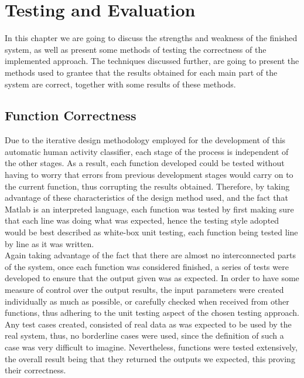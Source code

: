 \documentclass[11pt]{report}
\begin{document}
\clearpage

\chapter{Testing and Evaluation}
In this chapter we are going to discuss the strengths and weakness  of the finished system, as well as present some methods of testing the correctness of the implemented approach. The techniques discussed further, are going to present the methods used to grantee that the results obtained for each main part of the system are correct, together with some results of these methods.\\

\section{Function Correctness}
Due to the iterative design methodology employed for the development of this automatic human activity classifier, each stage of the process is independent of the other stages. As a result, each function developed could be tested without having to worry that errors from previous development stages would carry on to the current function, thus corrupting the results obtained. Therefore, by taking advantage of these characteristics of the design method used, and the fact that Matlab is an interpreted language, each function was tested by first making sure that each line was doing what was expected, hence the testing style adopted would be best described as white-box unit testing, each function being tested line by line as it was written. \\
Again taking advantage of the fact that there are almost no interconnected parts of the system, once each function was considered finished, a series of tests were developed to ensure that the output given was as expected. In order to have some measure of control over the output results, the input parameters were created individually as much as possible, or carefully checked when received from other functions, thus adhering to the unit testing aspect of the chosen testing approach. \\
Any test cases created, consisted of real data as was expected to be used by the real system, thus, no borderline cases were used, since the definition of such a case was very difficult to imagine. Nevertheless, functions were tested extensively, the overall result being that they returned the outputs we expected, this proving their correctness. \\
\end{document}
